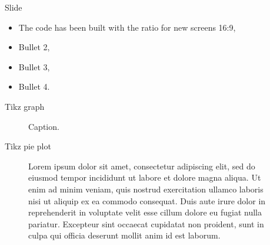 
\def\currentAspect{169}



 
 
 
 
 

 
 




\ifx\currentAspect\oldAspect
	\def\sometext{The code has been built with the ratio for old screens 4:3}
\else
	\def\sometext{The code has been built with the ratio for new screens 16:9}
\fi



\begin{frame}{Slide }
\begin{itemize}
\setlength\itemsep{\fill}
\item \sometext,
\item Bullet 2,
\item Bullet 3,
\item Bullet 4.
\end{itemize}
\end{frame}


\begin{frame}{Tikz graph}
\begin{figure}[H]
\centering


\vspace{-10pt}
\caption{Caption.}
\end{figure}
\end{frame}

\begin{frame}{Tikz pie plot}
\ifx\currentAspect\oldAspect
	\vspace{-20pt}
\else
	\vspace{-5pt}
\fi
\begin{figure}[H]
\centering


\ifx\currentAspect\oldAspect
	\vspace{-15pt}
\else
	\vspace{-5pt}
\fi

\caption{Lorem ipsum dolor sit amet, consectetur adipiscing elit, sed do eiusmod tempor incididunt ut labore et dolore magna aliqua. Ut enim ad minim veniam, quis nostrud exercitation ullamco laboris nisi ut aliquip ex ea commodo consequat. Duis aute irure dolor in reprehenderit in voluptate velit esse cillum dolore eu fugiat nulla pariatur. Excepteur sint occaecat cupidatat non proident, sunt in culpa qui officia deserunt mollit anim id est laborum.}
\end{figure}
\end{frame}


